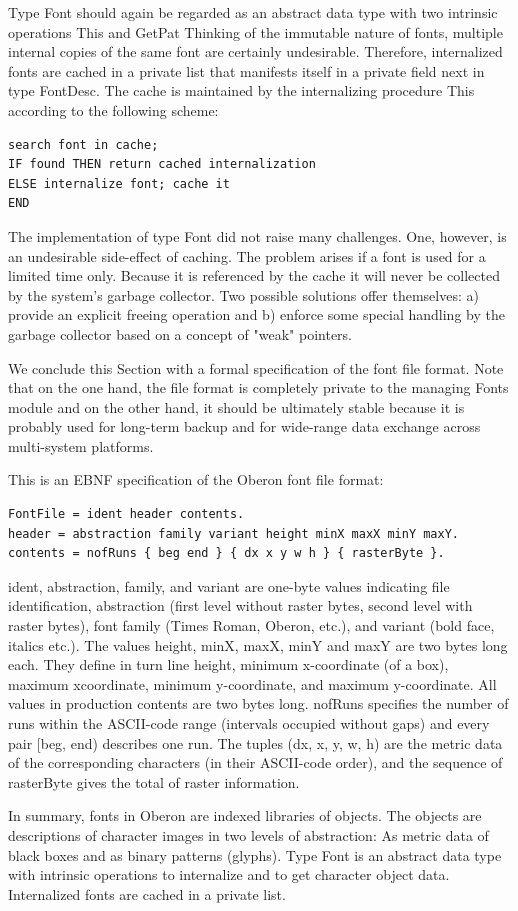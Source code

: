 Type Font should again be regarded as an abstract data type with two intrinsic operations This and
GetPat Thinking of the immutable nature of fonts, multiple internal copies of the same font are
certainly undesirable. Therefore, internalized fonts are cached in a private list that manifests itself in
a private field next in type FontDesc. The cache is maintained by the internalizing procedure This
according to the following scheme:
\begin{verbatim}
search font in cache;
IF found THEN return cached internalization
ELSE internalize font; cache it
END
\end{verbatim}
The implementation of type Font did not raise many challenges. One, however, is an undesirable
side-effect of caching. The problem arises if a font is used for a limited time only. Because it is
referenced by the cache it will never be collected by the system's garbage collector. Two possible
solutions offer themselves: a) provide an explicit freeing operation and b) enforce some special
handling by the garbage collector based on a concept of "weak" pointers.

We conclude this Section with a formal specification of the font file format. Note that on the one
hand, the file format is completely private to the managing Fonts module and on the other hand, it
should be ultimately stable because it is probably used for long-term backup and for wide-range
data exchange across multi-system platforms.

This is an EBNF specification of the Oberon font file format:
\begin{verbatim}
FontFile = ident header contents.
header = abstraction family variant height minX maxX minY maxY.
contents = nofRuns { beg end } { dx x y w h } { rasterByte }.
\end{verbatim}
ident, abstraction, family, and variant are one-byte values indicating file identification, abstraction
(first level without raster bytes, second level with raster bytes), font family (Times Roman, Oberon,
etc.), and variant (bold face, italics etc.). The values height, minX, maxX, minY and maxY are two
bytes long each. They define in turn line height, minimum x-coordinate (of a box), maximum xcoordinate, minimum y-coordinate, and maximum y-coordinate. All values in production contents are two bytes long. nofRuns specifies the number of runs within the ASCII-code range (intervals
occupied without gaps) and every pair [beg, end) describes one run. The tuples (dx, x, y, w, h) are
the metric data of the corresponding characters (in their ASCII-code order), and the sequence of
rasterByte gives the total of raster information.

In summary, fonts in Oberon are indexed libraries of objects. The objects are descriptions of
character images in two levels of abstraction: As metric data of black boxes and as binary patterns
(glyphs). Type Font is an abstract data type with intrinsic operations to internalize and to get
character object data. Internalized fonts are cached in a private list.


